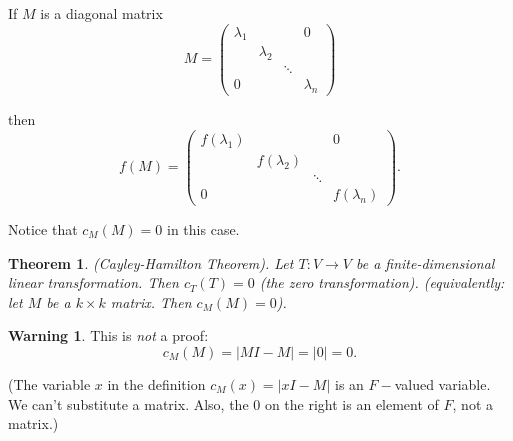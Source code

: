 \documentclass{article}
\newtheorem{theorem}{Theorem}
\theoremstyle{definition} \newtheorem*{definition}{Definition}
\newtheorem*{warning}{Warning}
\begin{document}
  \begin{remark}
    If $M$ is a diagonal matrix 
    \[
      M = \left( 
      \begin{matrix}
        \lambda_1 & & & 0\\
                  &\lambda_2 & & \\
                 &  & \ddots & \\
        0 & & & \lambda_n
      \end{matrix}
      \right)
    \]

    then
    \[
      f(M) = \left( 
      \begin{matrix}
        f(\lambda_1) & & & 0\\
                  &f(\lambda_2) & & \\
                 &  & \ddots & \\
        0 & & & f(\lambda_n)
      \end{matrix}
      \right).
    \]

    Notice that $c_M(M) = 0$ in this case.\\
  \end{remark}

  \begin{theorem}
    (Cayley-Hamilton Theorem). Let $T:V \rightarrow V$ be a
    finite-dimensional linear
    transformation. Then $c_T(T) = 0$ (the zero transformation).
    (equivalently: let $M$ be a $k \times k$ matrix. Then $c_M(M)=0$).\\
    \label{thm:cht}
  \end{theorem}

  \begin{warning}
    This is \emph{not} a proof:
    \[
      c_M(M) = |MI - M| = |0| = 0.
    \]

    (The variable $x$ in the definition $c_M(x)=|xI - M|$ is an $F-$valued
    variable. We can't substitute a matrix. Also, the 0 on the right is an
    element of $F$, not a matrix.)
  \end{warning}
\end{document}
